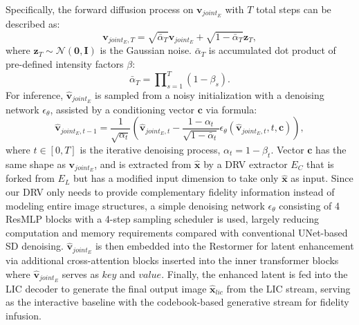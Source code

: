 Specifically, the forward diffusion process on $\textbf{v}_{joint_{E}}$ with $T$ total steps can be described as:
\begin{equation}
    \textbf{v}_{joint_{E},T} = \sqrt{\bar{\alpha}_T} \mathbf{v}_{joint_{E}} + \sqrt{1 - \bar{\alpha}_T} \mathbf{z}_T, \label{eqn:diffusion_drv1}
\end{equation}
where \(\mathbf{z}_T \sim \mathcal{N}(\mathbf{0}, \mathbf{I})\) is the Gaussian noise. \(\!\bar{\alpha}_T\) is accumulated dot product of pre-defined intensity factors $\beta$: 
\begin{equation}
    \bar{\alpha}_T = \prod\nolimits_{s=1}^{T} (1 - \beta_s). \label{eqn:diffusion_drv2}
\end{equation}
For inference, $\hat{\textbf{v}}_{joint_{E}}$ is sampled from a noisy initialization with a denoising network $\epsilon_\theta$, assisted by a conditioning vector $\textbf{c}$ via formula:
\small
\begin{equation}
\!\!\!\!\!\!\!\hat{\mathbf{v}}_{joint_{E}, t-1}\!=\!\frac{1}{\sqrt{\alpha_t}} \left(\!\hat{\mathbf{v}}_{joint_{E}, t}\!-\!\frac{1\!-\!\alpha_t}{\sqrt{1 \!-\!\bar{\alpha}_t}} \epsilon_\theta(\hat{\mathbf{v}}_{joint_{E},t}, t, \textbf{c})\! \right)\!,\!\label{eqn:diffusion_drv} 
\end{equation}
where $t \in [0,T]$ is the iterative denoising process, $\alpha_t = 1 - \beta_{t}$. Vector
$\textbf{c}$ has the same shape as $\textbf{v}_{joint_{E}}$, and is extracted from ${\hat{\textbf{x}}}$ by a DRV extractor $E_{C}$ that is forked from $E_{L}$ but has a modified input dimension to take only ${\hat{\textbf{x}}}$ as input.
Since our DRV only needs to provide complementary fidelity information instead of modeling entire image structures, a simple denoising network $\epsilon_\theta$ consisting of 4 ResMLP blocks with a 4-step sampling scheduler is used, largely reducing computation and memory requirements compared with conventional UNet-based SD denoising.
$\hat{\textbf{v}}_{joint_{E}}$ is then embedded into the Restormer \cite{zamir2022restormer} for latent enhancement via additional cross-attention blocks inserted into the inner transformer blocks where $\hat{\textbf{v}}_{joint_{E}}$ serves as $key$ and $value$. Finally, the enhanced latent is fed into the LIC decoder to generate the final output image ${\hat{\textbf{x}}}_{lic}$ from the LIC stream, serving as the interactive baseline with the codebook-based generative stream for fidelity infusion.


